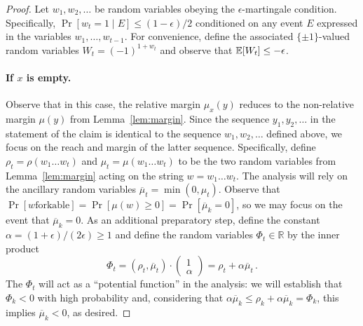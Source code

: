 
\begin{proof}
  Let $w_1, w_2, \ldots$ be random variables obeying the
  $\epsilon$-martingale condition.  Specifically,
  $\Pr[w_t = 1 \mid E] \leq (1 - \epsilon)/2$ conditioned on any event
  $E$ expressed in the variables $w_1, \ldots, w_{t-1}$.  For
  convenience, define the associated $\{\pm1\}$-valued random
  variables $W_t = (-1)^{1+w_t}$ and observe that
  $\operatorname{\mathbb{E}}[W_t] \leq -\epsilon$.

\paragraph{If $x$ is empty.}
Observe that in this case, the relative margin $\mu_x(y)$ reduces to 
the non-relative margin $\mu(y)$ from Lemma~\ref{lem:margin}. 
Since the sequence $y_1, y_2, \ldots$ in the statement of the claim 
is identical to the sequence $w_1, w_2, \ldots$ defined above, 
we focus on the reach and margin of the latter sequence. 
Specifically, define $\rho_t = \rho(w_1 \ldots w_t)$ and
$\mu_t = \mu(w_1 \ldots w_t)$ to be the two random variables from
Lemma~\ref{lem:margin} acting on the string $w=w_1 \ldots w_t$. The
analysis will rely on the ancillary random variables
$\overline{\mu}_t = \min(0,\mu_t)$.  Observe that $\Pr[\text{$w$
  forkable}] = \Pr[\mu(w) \geq 0] = \Pr[\overline{\mu}_k = 0]$, so we
may focus on the event that $\overline{\mu}_k = 0$. As an additional
preparatory step, define the constant
$\alpha = (1+\epsilon)/(2\epsilon) \geq 1$ and define the random
variables $\Phi_t \in \mathbb{R}$ by the inner product
  \[
    \Phi_t = (\rho_t, \overline{\mu}_t) \cdot
    \left(\begin{array}{c} 1\\ \alpha\end{array}\right) = \rho_t +
    \alpha \overline{\mu}_t\,.
  \]
  The $\Phi_t$ will act as a ``potential function'' in the analysis:
  we will establish that $\Phi_k < 0$ with high probability and,
  considering that
  $\alpha\overline{\mu}_k \leq \rho_k + \alpha \overline{\mu}_k =
  \Phi_k$, this implies $\overline{\mu}_k < 0$, as desired.
  

\end{proof}
